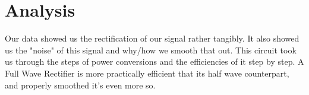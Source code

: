 \documentclass[prb,preprint]{revtex4-1}
\begin{document}
\section{Analysis}
Our data showed us the rectification of our signal rather tangibly. It also showed us the "noise" of this signal and why/how we smooth that out. This circuit took us through the steps of power conversions and the efficiencies of it step by step. A Full Wave Rectifier is more practically efficient that its half wave counterpart, and properly smoothed it's even more so.

\end{document}
